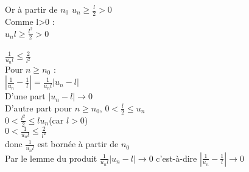 \documentclass{article}
\begin{document}
Or à partir de $n_0$ $u_n\geq \frac{l}{2}>0$ \\ 
Comme l>0 : \\ 
$u_nl \geq \frac{l^2}{2}>0$\\ \\ 
$\frac{1}{u_nl}\leq \frac{2}{l^2}$ \\ 
Pour $n \geq n_0$ : \\ 
$|\frac{1}{u_n}-\frac{1}{l}|=\frac{1}{u_n l} |u_n-l|$ \\ 
D'une part $|u_n-l| \rightarrow 0$ \\ 
D'autre part pour $n \geq n_0$, $0<\frac{l}{2}\leq u_n$ \\ 
$0<\frac{l^2}{2}\leq l u_n$(car $l>0$) \\ 
$0<\frac{1}{u_n l}\leq \frac{2}{l^2}$ \\ 
donc $\frac{1}{u_n l}$ est bornée à partir de $n_0$ \\ 
Par le lemme du produit $ \frac{1}{u_nl}|u_n-l| \rightarrow 0$ c'est-à-dire $|\frac{1}{u_n}-\frac{1}{l}| \rightarrow 0$
\end{document}
